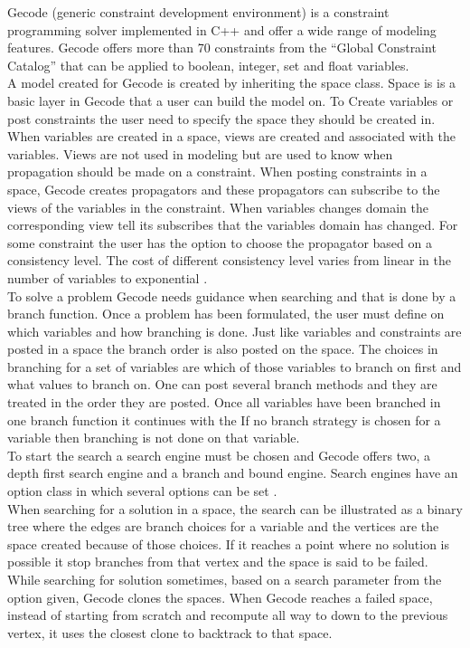 Gecode (generic constraint development environment) is a constraint programming solver implemented in C++ and 
offer a wide range of modeling features. Gecode offers more than 70 constraints from the ``Global Constraint Catalog'' 
\cite{url_globalCons} that can be applied to boolean, integer, set and float variables.  \\ 
A model created for Gecode is created by inheriting the space class. Space is is a basic layer in Gecode that a user 
can build the model on. To Create variables or post constraints the user need to specify the space they should be 
created in. When variables are created in a space, views are created and associated with the variables. 
Views are not used in modeling but are used to know when propagation should be made on a constraint.  When posting 
constraints in a space, Gecode creates propagators and these propagators can subscribe to the views of the variables 
in the constraint. When variables changes domain the corresponding view tell its subscribes that the variables domain 
has changed. For some constraint the user has the option to choose the propagator based on a consistency level. 
The cost of different consistency level varies from linear in the number of variables to exponential \cite[p.57]{MPG:M}. 
\\
To solve a problem Gecode needs guidance when searching and that is done by a branch function. Once a problem has been 
formulated, the user must define on which variables and how branching is done. Just like variables and constraints are 
posted in a space the branch order is also posted on the space. The choices in branching for a set of variables are 
which of those variables to branch on first and what values to branch on. One can post several branch methods and they 
are treated in the order they are posted. Once all variables have been branched in one branch function it continues 
with the  If no branch strategy is chosen for a variable then branching is not done on that variable. \\ 
To start the search a search engine must be chosen and Gecode offers two, a depth first search engine and a branch and 
bound engine. Search engines have an option class in which several options can be set \cite[p.157]{MPG:M}. \\ 
When searching for a solution in a space, the search can be illustrated as a binary tree where the edges are 
branch choices for a variable and the vertices are the space created because of those choices. If it reaches a point 
where no solution is possible it stop branches from that vertex and the space is said to be failed. While searching for 
solution sometimes, based on a search parameter from the option given, Gecode clones the spaces. When Gecode 
reaches a failed space, instead of starting from scratch and recompute all way to down to the previous vertex, it 
uses the closest clone to backtrack to that space. \\